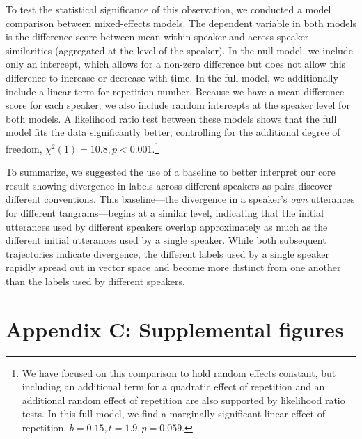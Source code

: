 \documentclass[alpha-refs]{wiley-article}
\begin{document}
To test the statistical significance of this observation, we conducted a model comparison between mixed-effects models.
The dependent variable in both models is the difference score between mean within-speaker and across-speaker similarities (aggregated at the level of the speaker).
In the null model, we include only an intercept, which allows for a non-zero difference but does not allow this difference to increase or decrease with time.
In the full model, we additionally include a linear term for repetition number.
Because we have a mean difference score for each speaker, we also include random intercepts at the speaker level for both models.
A likelihood ratio test between these models shows that the full model fits the data significantly better, controlling for the additional degree of freedom, $\chi^2(1) = 10.8, p < 0.001$.\footnote{We have focused on this comparison to hold random effects constant, but including an additional term for a quadratic effect of repetition and an additional random effect of repetition are also supported by likelihood ratio tests. In this full model, we find a marginally significant linear effect of repetition, $b = 0.15, t = 1.9, p = 0.059$.}

To summarize, we suggested the use of a baseline to better interpret our core result showing divergence in labels across different speakers as pairs discover different conventions.
This baseline---the divergence in a speaker's \emph{own} utterances for different tangrams---begins at a similar level, indicating that the initial utterances used by different speakers overlap approximately as much as the different initial utterances used by a single speaker.
While both subsequent trajectories indicate divergence, the different labels used by a single speaker rapidly spread out in vector space and become more distinct from one another than the labels used by different speakers.

\newpage

\section*{Appendix C: Supplemental figures}
\end{document}
